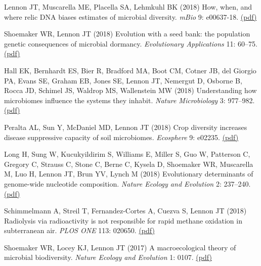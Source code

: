\documentclass[11pt]{article}
\begin{document}
\begin{etaremune}
\item Lennon JT, Muscarella ME, Placella SA, Lehmkuhl BK (2018) How, when, and where relic DNA biases estimates of microbial diversity. \textit{mBio} 9: e00637-18. \href{https://lennonlab.github.io/assets/publications/Lennon_etal_2018.pdf}{(pdf)}

\item Shoemaker WR, Lennon JT (2018) Evolution with a seed bank: the population genetic consequences of microbial dormancy. \textit{Evolutionary Applications} 11: 60–75. \href{https://lennonlab.github.io/assets/publications/Shoemaker_Lennon_2018.pdf}{(pdf)}

\item Hall EK, Bernhardt ES, Bier R, Bradford MA, Boot CM, Cotner JB, del Giorgio PA, Evans SE, Graham EB, Jones SE, Lennon JT, Nemergut D, Osborne B, Rocca JD, Schimel JS, Waldrop MS, Wallenstein MW (2018) Understanding how microbiomes influence the systems they inhabit. \textit{Nature Microbiology} 3: 977–982. \href{https://lennonlab.github.io/assets/publications/Hall_etal_2018.pdf}{(pdf)}

\item Peralta AL, Sun Y, McDaniel MD, Lennon JT (2018) Crop diversity increases disease suppressive capacity of soil microbiomes. \textit{Ecosphere} 9: e02235. \href{https://lennonlab.github.io/assets/publications/Peralta_etal_2018.pdf}{(pdf)}

\item Long H, Sung W, Kucukyildirim S, Williams E, Miller S, Guo W, Patterson C, Gregory C, Strauss C, Stone C, Berne C, Kysela D, Shoemaker WR, Muscarella M, Luo H, Lennon JT, Brun YV, Lynch M (2018) Evolutionary determinants of genome-wide nucleotide composition. \textit{Nature Ecology and Evolution} 2: 237--240. \href{https://lennonlab.github.io/assets/publications/Long_etal_2018.pdf}{(pdf)}

\item Schimmelmann A, Streil T, Fernandez-Cortes A, Cuezva S, Lennon JT (2018) Radiolysis via radioactivity is not responsible for rapid methane oxidation in subterranean air. \textit{PLOS ONE} 113: 020650. \href{https://lennonlab.github.io/assets/publications/Schimmelmann_etal_2018.pdf}{(pdf)}

\item Shoemaker WR, Locey KJ, Lennon JT (2017) A macroecological theory of microbial biodiversity. \textit{Nature Ecology and Evolution} 1: 0107. \href{https://lennonlab.github.io/assets/publications/Shoemaker_etal_2017.pdf}{(pdf)}


\end{etaremune}
\end{document}
